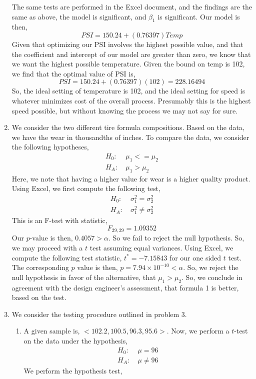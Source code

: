 \documentclass[letterpaper,10pt]{article}
\begin{document}
\begin{enumerate}
The same tests are performed in the Excel document, and the findings are the same as above, the model is significant, and $\beta_1$ is significant. Our model is then,
\[PSI=150.24+(0.76397)Temp\]
Given that optimizing our PSI involves the highest possible value, and that the coefficient and intercept of our model are greater than zero, we know that we want the highest possible temperature. Given the bound on temp is 102, we find that the optimal value of PSI is,
\[PSI=150.24+(0.76397)(102)=228.16494\]
So, the ideal setting of temperature is 102, and the ideal setting for speed is whatever minimizes cost of the overall process. Presumably this is the highest speed possible, but without knowing the process we may not say for sure.
\item We consider the two different tire formula compositions. Based on the data, we have the wear in thousandths of inches. To compare the data, we consider the following hypotheses,
\begin{align*}
H_0:\ & \mu_1 <= \mu_2\\
H_A:\ & \mu_1 > \mu_2 
\end{align*}
Here, we note that having a higher value for wear is a higher quality product. Using Excel, we first compute the following test,
\begin{align*}
H_0:\ & \sigma_1^2 = \sigma_2^2\\
H_A:\ & \sigma_1^2 \neq \sigma_2^2
\end{align*}
This is an F-test with statistic,
\[F_{29,29}=1.09352\]
Our $p$-value is then, $0.4057>\alpha$. So we fail to reject the null hypothesis. So, we may proceed with a $t$ test assuming equal variances. Using Excel, we compute the following test statistic, $t^*=-7.15843$ for our one sided $t$ test. The corresponding $p$ value is then, $p=7.94\times 10^{-10}<\alpha$. So, we reject the null hypothesis in favor of the alternative, that $\mu_1 > \mu_2$. So, we conclude in agreement with the design engineer's assessment, that formula 1 is better, based on the test.
\item We consider the testing procedure outlined in problem 3.
\begin{enumerate}
\item A given sample is, $<102.2, 100.5, 96.3, 95.6>$. Now, we perform a $t$-test on the data under the hypothesis,
\begin{align*}
H_0:\ & \mu = 96\\
H_A:\ & \mu\neq 96
\end{align*}
We perform the hypothesis test,

\end{enumerate}
\end{enumerate}
\end{document}
